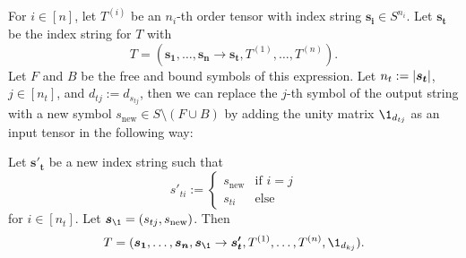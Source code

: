 \begin{lemma}
    \label{lemma:nested_einsum:2}
    For $i \in [n]$, let $T^{(i)}$ be an $n_i$-th order tensor with index string $\bm{s_i} \in S^{n_i}$.
    Let $\bm{s_t}$ be the index string for $T$ with
    $$T = (\bm{s_1}, \dots, \bm{s_n} \rightarrow \bm{s_t}, T^{(1)}, \dots, T^{(n)}).$$
    Let $F$ and $B$ be the free and bound symbols of this expression.
    Let $n_t := \left\lvert \bm{s_t} \right\rvert$, $j \in [n_t]$, and $d_{tj} := d_{s_{tj}}$, then we can replace the $j$-th symbol of the output string with a new symbol $s_{\text{new}} \in S \setminus (F \cup B)$ by adding the unity matrix $\1_{d_{tj}}$ as an input tensor in the following way:

    Let $\bm{s'_t}$ be a new index string such that
    $$s'_{ti} := \begin{cases}
            s_{\text{new}} & \text{if $i = j$} \\
            s_{ti}         & \text{else}
        \end{cases}$$
    for $i \in [n_t]$.
    Let $\bm{s_\1} = (s_{tj}, s_{\text{new}})$.
    Then
    $$T = (\bm{s_1}, \dots, \bm{s_n}, \bm{s_\1} \rightarrow \bm{s'_t}, T^{(1)}, \dots, T^{(n)}, \1_{d_{kj}}).$$
\end{lemma}

